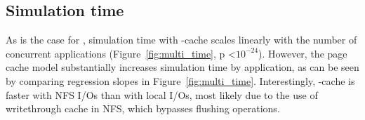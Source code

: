 \subsection{Simulation time}

As is the case for \wrench, simulation time with \wrench-cache scales
linearly with the number of concurrent applications
(Figure~\ref{fig:multi_time}, p \textless $10^{-24}$). However, the page
cache model substantially increases simulation time by
application, as can be seen by comparing regression slopes in
Figure~\ref{fig:multi_time}. Interestingly, \wrench-cache is faster with 
NFS I/Os than with local I/Os, most likely due to the use of writethrough
cache in NFS, which bypasses flushing operations.